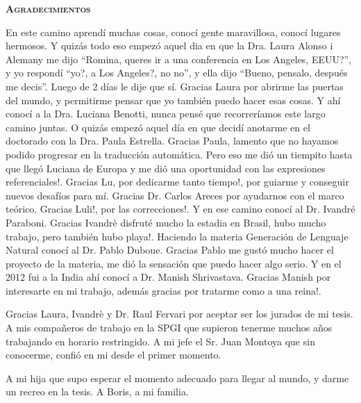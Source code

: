 \thispagestyle{empty}


\begin{center}

{ \vspace*{1cm} }
\huge{\textbf{\textsc{\textmd{Agradecimientos}}}}\\[1cm]

\end{center}

\normalsize{

En este camino aprend\'i muchas cosas, conoc\'i gente maravillosa, conoc\'i lugares hermosos. Y quiz\'as todo eso empez\'o aquel dia en que la Dra. Laura Alonso i Alemany me dijo ``Romina, queres ir a una conferencia en Los Angeles, EEUU?'', y yo respond\'i ``yo?, a Los Angeles?, no no'', y ella dijo ``Bueno, pensalo, despu\'es me decis''. Luego de 2 d\'ias le dije que s\'i. Gracias Laura por abrirme las puertas del mundo, y permitirme pensar que yo tambi\'en puedo hacer esas cosas. Y ah\'i conoc\'i a la Dra. Luciana Benotti, nunca pens\'e que recorrer\'iamos este largo camino juntas. O quiz\'as empez\'o aquel d\'ia en que decid\'i anotarme en el doctorado con la Dra. Paula Estrella. Gracias Paula, lamento que no hayamos podido progresar en la traducci\'on autom\'atica. Pero eso me di\'o un tiempito hasta que lleg\'o Luciana de Europa y me di\'o una oportunidad con las expresiones referenciales!. Gracias Lu, por dedicarme tanto tiempo!, por guiarme y conseguir nuevos desaf\'ios para m\'i. Gracias Dr. Carlos Areces por ayudarnos con el marco te\'orico. Gracias Luli!, por las correcciones!. 
Y en ese camino conoc\'i al Dr. Ivandr\'e Paraboni. Gracias Ivandr\`e disfrut\'e mucho la estadia en Brasil, hubo mucho trabajo, pero tambi\'en hubo playa!. Haciendo la materia Generaci\'on de Lenguaje Natural conoc\'i al Dr. Pablo Duboue. Gracias Pablo me gust\'o mucho hacer el proyecto de la materia, me di\'o la sensaci\'on que puedo hacer algo serio. Y en el 2012 fui a la India ah\'i conoc\'i a Dr. Manish Shrivastava. Gracias Manish por interesarte en mi trabajo, adem\'as gracias por tratarme como a una reina!. 

Gracias Laura, Ivandr\`e y Dr. Raul Fervari por aceptar ser los jurados de mi tesis.
A mis compa\~neros de trabajo en la SPGI que supieron tenerme muchos a\~nos trabajando en horario restringido. A mi jefe el Sr. Juan Montoya que sin conocerme, confi\'o en mi desde el primer momento.

A mi hija que supo esperar el momento adecuado para llegar al mundo, y darme un recreo en la tesis. A Boris, a mi familia. 
}

\vspace{\fill}

